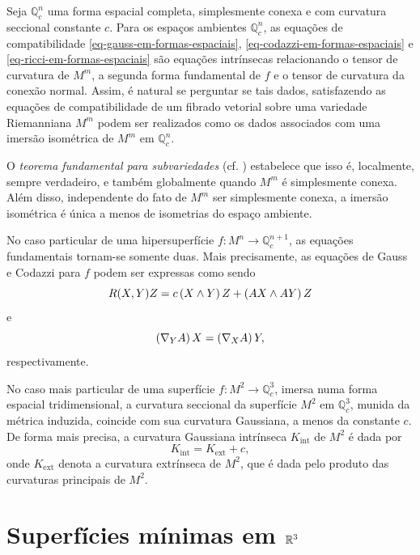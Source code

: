 Seja $\mathbb{Q}^n_c$ uma forma espacial completa, simplesmente conexa e com curvatura seccional constante $c$. Para os espaços ambientes $\mathbb{Q}^n_c$, as equações de compatibilidade \eqref{eq-gauss-em-formas-espaciais}, \eqref{eq-codazzi-em-formas-espaciais} e \eqref{eq-ricci-em-formas-espaciais} são equações intrínsecas relacionando o tensor de curvatura de $M^m$, a segunda forma fundamental de $f$ e o tensor de curvatura da conexão normal. Assim, é natural se perguntar se tais dados, satisfazendo as equações de compatibilidade de um fibrado vetorial sobre uma variedade Riemanniana $M^m$ podem ser realizados como os dados associados com uma imersão isométrica de $M^m$ em $\mathbb{Q}^n_c$.

O \emph{teorema fundamental para subvariedades} (cf. \cite[Theorem 1.10]{Dajczer2019}) estabelece que isso é, localmente, sempre verdadeiro, e também globalmente quando $M^m$ é simplesmente conexa. Além disso, independente do fato de $M^m$ ser simplesmente conexa, a imersão isométrica é única a menos de isometrias do espaço ambiente.

No caso particular de uma hipersuperfície $f: M^n \rightarrow \mathbb{Q}^{n+1}_c$, as equações fundamentais tornam-se somente duas. Mais precisamente, as equações de Gauss e Codazzi para $f$ podem ser expressas como sendo
\begin{equation}
	R(X,Y)Z = c \left( X \wedge Y \right) Z + \left( AX \wedge AY \right) Z
\end{equation}
e
\begin{equation}
	\left( \nabla_Y A \right) X = \left( \nabla_X A \right) Y,
\end{equation}
respectivamente.

No caso mais particular de uma superfície $f: M^2 \rightarrow \mathbb{Q}^3_c$, imersa numa forma espacial tridimensional, a curvatura seccional da superfície $M^2$ em $\mathbb{Q}^3_c$, munida da métrica induzida, coincide com sua curvatura Gaussiana, a menos da constante $c$. De forma mais precisa, a curvatura Gaussiana intrínseca $K_{\text{int}}$ de $M^2$ é dada por
\begin{equation}\label{eq:gausshyp}
	K_{\text{int}} = K_{\text{ext}} + c,
\end{equation}
onde $K_{\text{ext}}$ denota a curvatura extrínseca de $M^2$, que é dada pelo produto das curvaturas principais de $M^2$.


\section{Superfícies mínimas em $\mathbb{R}^3$}

